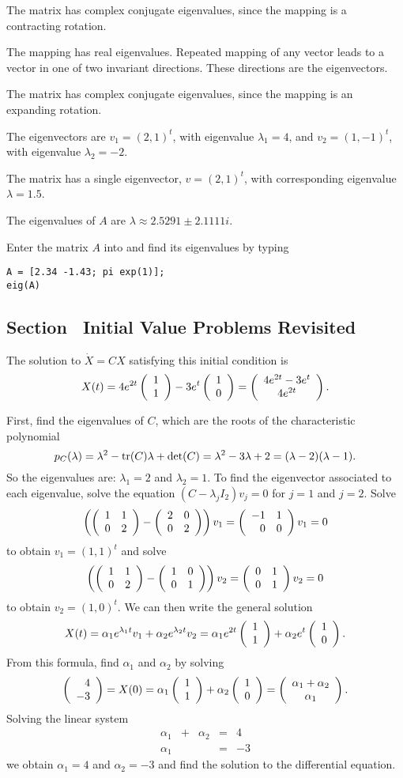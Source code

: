  The matrix has complex conjugate eigenvalues, since the
mapping is a contracting rotation.

 The mapping has real eigenvalues.  Repeated mapping of any
vector leads to a vector in one of two invariant directions.  These
directions are the eigenvectors.

 The matrix has complex conjugate eigenvalues, since the
mapping is an expanding rotation.

 The eigenvectors are $v_1 = (2,1)^t$, with eigenvalue
$\lambda_1 = 4$, and $v_2 = (1,-1)^t$, with eigenvalue $\lambda_2 = -2$.

 The matrix has a single eigenvector, $v = (2,1)^t$, with
corresponding eigenvalue $\lambda = 1.5$.

 \ans The eigenvalues of $A$ are $\lambda \approx 2.5291 \pm
2.1111i$.

\soln Enter the matrix $A$ into \Matlab and find its eigenvalues by typing
\begin{verbatim}
A = [2.34 -1.43; pi exp(1)];
eig(A)
\end{verbatim}









\subsection*{Section~\protect{\ref{S:IVPR}} Initial Value Problems Revisited}


 \ans The solution to $\dot{X} = CX$ satisfying this
initial condition is
\[
X(t) = 4e^{2t}\left(\begin{array}{r} 1 \\ 1\end{array}\right) - 3e^t\left(\begin{array}{r} 1 \\ 0\end{array}\right)
= \left(\begin{array}{c} 4e^{2t} - 3e^t \\ 4e^{2t}\end{array}\right).
\]

\soln First, find the eigenvalues of $C$, which are the roots of the
characteristic polynomial
\[
p_C(\lambda) = \lambda^2 - {\rm tr}(C)\lambda + \det(C) =
\lambda^2 - 3\lambda + 2 = (\lambda - 2)(\lambda - 1).
\]
So the eigenvalues are: $\lambda_1 = 2$ and $\lambda_2 = 1$.
To find the eigenvector associated to each eigenvalue, solve
the equation $(C - \lambda_jI_2)v_j = 0$ for $j = 1$ and $j = 2$.  Solve
\[
\left(\left(\begin{array}{rr} 1 & 1\\ 0 &2\end{array}\right) - \left(\begin{array}{rr} 2 & 0\\ 0 &2\end{array}\right)\right)v_1 =
\left(\begin{array}{rr} -1 & 1\\ 0 &0\end{array}\right)v_1 = 0
\]
to obtain $v_1 = (1,1)^t$ and solve
\[
\left(\left(\begin{array}{rr} 1 & 1\\ 0 &2\end{array}\right) - \left(\begin{array}{rr} 1 & 0\\ 0 &1\end{array}\right)\right)v_2 =
\left(\begin{array}{rr} 0 & 1\\ 0 &1\end{array}\right)v_2 = 0
\]
to obtain $v_2 = (1,0)^t$.  We can then write the general solution
\[
X(t) = \alpha_1e^{\lambda_1 t}v_1 + \alpha_2e^{\lambda_2 t}v_2
= \alpha_1e^{2t}\left(\begin{array}{r} 1 \\ 1\end{array}\right) + \alpha_2e^t\left(\begin{array}{r} 1 \\ 0\end{array}\right).
\]
From this formula, find $\alpha_1$ and $\alpha_2$ by solving
\[
\left(\begin{array}{r} 4 \\ -3\end{array}\right) = X(0) = \alpha_1\left(\begin{array}{r} 1 \\ 1\end{array}\right) + \alpha_2\left(\begin{array}{r} 1 \\ 0\end{array}\right) =
\left(\begin{array}{c} \alpha_1 + \alpha_2 \\ \alpha_1\end{array}\right).
\]
Solving the linear system
\[
\begin{array}{rrrrr}
\alpha_1 & + & \alpha_2 & = & 4 \\
\alpha_1 & & & = & -3
\end{array}
\]
we obtain $\alpha_1 = 4$ and $\alpha_2 = -3$ and find the
solution to the differential equation.


